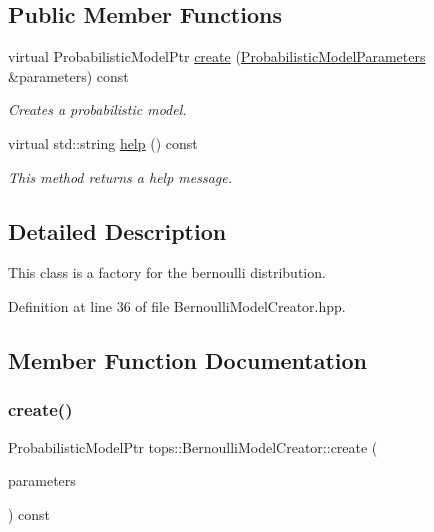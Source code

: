 \subsection*{Public Member Functions}
\begin{DoxyCompactItemize}
\item 
virtual Probabilistic\+Model\+Ptr \hyperlink{classtops_1_1BernoulliModelCreator_a7269fc3cbc7bef0bc7456e6cf2ec44b3}{create} (\hyperlink{classtops_1_1ProbabilisticModelParameters}{Probabilistic\+Model\+Parameters} \&parameters) const
\begin{DoxyCompactList}\small\item\em Creates a probabilistic model. \end{DoxyCompactList}\item 
\mbox{\label{classtops_1_1BernoulliModelCreator_a7b95b973ccc98192f835e98b656cd6ee}} 
virtual std\+::string \hyperlink{classtops_1_1BernoulliModelCreator_a7b95b973ccc98192f835e98b656cd6ee}{help} () const
\begin{DoxyCompactList}\small\item\em This method returns a help message. \end{DoxyCompactList}\end{DoxyCompactItemize}


\subsection{Detailed Description}
This class is a factory for the bernoulli distribution. 

Definition at line 36 of file Bernoulli\+Model\+Creator.\+hpp.



\subsection{Member Function Documentation}
\mbox{\label{classtops_1_1BernoulliModelCreator_a7269fc3cbc7bef0bc7456e6cf2ec44b3}} 
\subsubsection{\texorpdfstring{create()}{create()}}
{\footnotesize\ttfamily Probabilistic\+Model\+Ptr tops\+::\+Bernoulli\+Model\+Creator\+::create (\begin{DoxyParamCaption}\item[{\hyperlink{classtops_1_1ProbabilisticModelParameters}{Probabilistic\+Model\+Parameters} \&}]{parameters }\end{DoxyParamCaption}) const\hspace{0.3cm}{\ttfamily [virtual]}}



